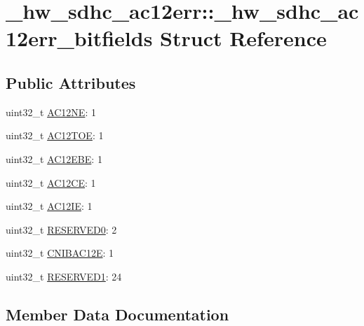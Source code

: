 \hypertarget{struct__hw__sdhc__ac12err_1_1__hw__sdhc__ac12err__bitfields}{}\section{\+\_\+hw\+\_\+sdhc\+\_\+ac12err\+:\+:\+\_\+hw\+\_\+sdhc\+\_\+ac12err\+\_\+bitfields Struct Reference}
\label{struct__hw__sdhc__ac12err_1_1__hw__sdhc__ac12err__bitfields}
\subsection*{Public Attributes}
\begin{DoxyCompactItemize}
\item 
uint32\+\_\+t \hyperlink{struct__hw__sdhc__ac12err_1_1__hw__sdhc__ac12err__bitfields_add156120810077cedb87bdad05d863fe}{A\+C12\+NE}\+: 1
\item 
uint32\+\_\+t \hyperlink{struct__hw__sdhc__ac12err_1_1__hw__sdhc__ac12err__bitfields_afd6708b59b338f592b5f2d357631b11a}{A\+C12\+T\+OE}\+: 1
\item 
uint32\+\_\+t \hyperlink{struct__hw__sdhc__ac12err_1_1__hw__sdhc__ac12err__bitfields_a93e44769a9ac105ad4c1bdf24cecbfe3}{A\+C12\+E\+BE}\+: 1
\item 
uint32\+\_\+t \hyperlink{struct__hw__sdhc__ac12err_1_1__hw__sdhc__ac12err__bitfields_a0020a9cdaba6e76043c78d6989b8774a}{A\+C12\+CE}\+: 1
\item 
uint32\+\_\+t \hyperlink{struct__hw__sdhc__ac12err_1_1__hw__sdhc__ac12err__bitfields_a5207690366ef988e763e1a5b6e609652}{A\+C12\+IE}\+: 1
\item 
uint32\+\_\+t \hyperlink{struct__hw__sdhc__ac12err_1_1__hw__sdhc__ac12err__bitfields_a6c666d770a494539f468f7f2f7f6bcbb}{R\+E\+S\+E\+R\+V\+E\+D0}\+: 2
\item 
uint32\+\_\+t \hyperlink{struct__hw__sdhc__ac12err_1_1__hw__sdhc__ac12err__bitfields_a03d394a2d8bf90b6811463dfd68704bd}{C\+N\+I\+B\+A\+C12E}\+: 1
\item 
uint32\+\_\+t \hyperlink{struct__hw__sdhc__ac12err_1_1__hw__sdhc__ac12err__bitfields_a700f9c77dd513820fbb5d6c5d1fa6961}{R\+E\+S\+E\+R\+V\+E\+D1}\+: 24
\end{DoxyCompactItemize}


\subsection{Member Data Documentation}
